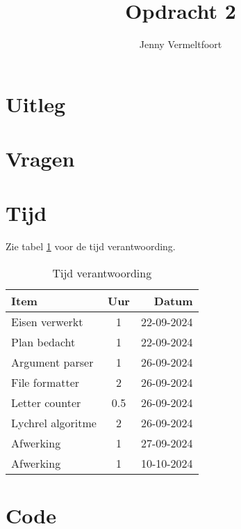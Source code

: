 \documentclass[10pt]{article}
\title{Opdracht 2}
\author{Jenny Vermeltfoort}
\begin{document}
\def\tablename{Tabel}

\maketitle

\section{Uitleg}

\section{Vragen}

\newpage
\section{Tijd}
Zie tabel \ref{tab:time} voor de tijd verantwoording.

\begin{table}[H]
    \begin{center}
        \begin{tabular}{ l c r }
            Item              & Uur & Datum      \\ \hline
            Eisen verwerkt    & 1   & 22-09-2024 \\
            Plan bedacht      & 1   & 22-09-2024 \\
            Argument parser   & 1   & 26-09-2024 \\
            File formatter    & 2   & 26-09-2024 \\
            Letter counter    & 0.5 & 26-09-2024 \\
            Lychrel algoritme & 2   & 26-09-2024 \\
            Afwerking         & 1   & 27-09-2024 \\
            Afwerking         & 1   & 10-10-2024 \\
        \end{tabular}

        \caption{Tijd verantwoording}
        \label{tab:time}
    \end{center}
\end{table}

\section{Code}\label{sec:code}

\end{document}
